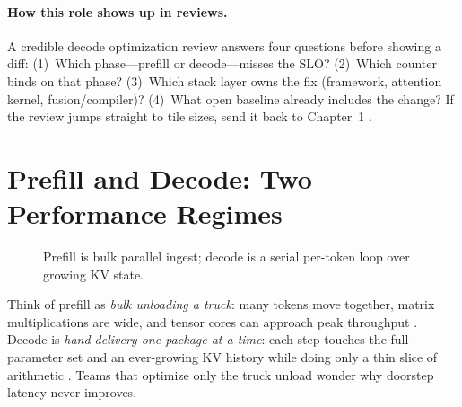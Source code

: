 \paragraph{How this role shows up in reviews.}
A credible decode optimization review answers four questions before showing a diff:
(1)~Which phase---prefill or decode---misses the SLO?
(2)~Which counter binds on that phase?
(3)~Which stack layer owns the fix (framework, attention kernel, fusion/compiler)?
(4)~What open baseline already includes the change?
If the review jumps straight to tile sizes, send it back to Chapter~1 \citep{taxbreak2026,memoryfloor2026}.

\section{Prefill and Decode: Two Performance Regimes}
\label{sec:prefill_decode}
\begin{figure}[t]
\centering
{}
\caption{Prefill is bulk parallel ingest; decode is a serial per-token loop over growing KV state.}
\label{fig:prefill_decode_pipeline}
\end{figure}

Think of prefill as \emph{bulk unloading a truck}: many tokens move together, matrix multiplications are wide, and tensor cores can approach peak throughput \citep{pichlmeier2024performancecharact,semianalysis2024tma}.
Decode is \emph{hand delivery one package at a time}: each step touches the full parameter set and an ever-growing KV history while doing only a thin slice of arithmetic \citep{li2024llminferenceservin,eto2025llmperformancebott}.
Teams that optimize only the truck unload wonder why doorstep latency never improves.


